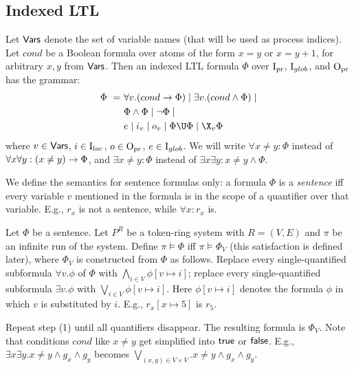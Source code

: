 \subsection*{Indexed LTL}

Let $\textsf{Vars}$ denote the set of variable names (that will be used as process indices).
Let $cond$ be a Boolean formula over atoms of the form $x = y$ or $x = y+1$,
for arbitrary $x,y$ from $\textsf{Vars}$.
Then an indexed LTL formula $\Phi$ over ${\mathrm{I}_{\mathrm{pr}}}$, $\mathrm{I}_{glob}$, and ${\mathrm{O}_{\mathrm{pr}}}$ has the grammar:
%
\begin{align*}
\Phi ~=~ & \forall v. (cond \impl \Phi) \| \exists v. (cond \land \Phi) \| \\
         & \Phi\land\Phi \| \neg \Phi \| \\
         & e \| i_v \| o_v \| \Phi \U \Phi \| \X_v \Phi
\end{align*}
%
where $v \in \textsf{Vars}$, $i \in \mathrm{I}_{loc}$, $o \in {\mathrm{O}_{\mathrm{pr}}}$, $e\in \mathrm{I}_{glob}$.
We will write $\forall x \neq y:\Phi$ instead of $\forall x\forall y: (x \neq y) \rightarrow \Phi$,
and $\exists x \neq y:\Phi$ instead of $\exists x\exists y: x \neq y \land \Phi$.

We define the semantics for sentence formulas only:
a formula $\Phi$ is a \emph{sentence} iff every variable $v$ mentioned in the formula
is in the scope of a quantifier over that variable.
E.g., $r_x$ is not a sentence, while $\forall x: r_x$ is.

Let $\Phi$ be a sentence.
Let $P^R$ be a token-ring system with $R=(V,E)$ and $\pi$ be an infinite run of the system.
Define $\pi\models \Phi$ iff $\pi \models \Phi_V$ (this satisfaction is defined later),
where $\Phi_V$ is constructed from $\Phi$ as follows.
\li
\-[1.]
Replace every single-quantified subformula $\forall v.\phi$ of $\Phi$
with $\bigwedge_{i \in V} \phi[v \mapsto i]$;
replace every single-quantified subformula $\exists v.\phi$
with $\bigvee_{i \in V} \phi[v \mapsto i]$.
Here $\phi[v \mapsto i]$ denotes the formula $\phi$
in which $v$ is substituted by $i$.
E.g., $r_x[x \mapsto 5]$ is $r_5$.

\-[2.]
Repeat step (1) until all quantifiers disappear.
The resulting formula is $\Phi_V$.
Note that conditions $cond$ like $x\neq y$ get simplified into $\textsf{true}$ or $\textsf{false}$.
\il
E.g., $\exists x\exists y.x\neq y \land g_x \land g_y$ becomes
$\bigvee_{(x,y) \in V\times V}.x\neq y \land g_x\land g_y$.

